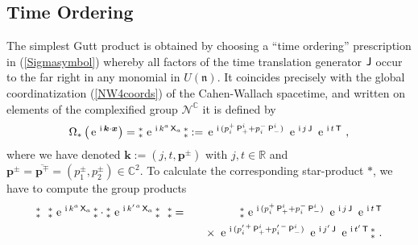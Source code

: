 \documentclass[11pt,a4paper]{article}
\newcommand{\NOa}{\mbox{$\substack{\ast\\\ast}$}}       %
\newcommand{\1}{\mathbb{1}}
\newcommand{\mbf}[1]{{\boldsymbol {#1} }}
\def\ii{{\,{\rm i}\,}}
\def\P{{\sf P}}
\def\T{{\sf T}}
\def\X{{\sf X}}
\def\J{{\sf J}}
\def\mx{{\mbf x}}
\def\mk{{\mbf k}}
\def\mbp{{\mbf p}}
\def\mfn{{\mathfrak n}}
\newcommand{\complex}{{\mathbb C}} %
\newcommand{\real}{{\mathbb R}} %
\def\e{{\,\rm e}\,}
\def\bea{\begin{eqnarray}}
\def\eea{\end{eqnarray}}
\begin{document}
\subsection{Time Ordering\label{TOP}}

The simplest Gutt product is obtained by choosing a ``time ordering''
prescription in (\ref{Sigmasymbol}) whereby all factors of the time
translation generator $\J$ occur to the far right in any monomial in
$U(\mfn)$. It coincides precisely with the global coordinatization
(\ref{NW4coords}) of the Cahen-Wallach spacetime, and written on
elements of the complexified group
$\mathcal{N}^\complex$ it is defined by
\begin{equation}
  \label{eq:time:defn}
\Omega_*\left(\e^{\ii\mk\cdot\mx}\right)=
\NOa\,\e^{\ii k^a\,\X_a}\,\NOa:=\e^{\ii(p_i^+\,\P^i_+
+p_i^-\,\P^i_-)}~\e^{\ii j\,\J}~\e^{\ii t\,\T} \ ,
\end{equation}
where we have denoted
$\mk:=(j,t,\mbp^\pm)$ with $j,t\in\real$ and
$\mbp^\pm=\overline{\mbp^\mp}=(p_1^\pm,p_2^\pm)\in\complex^2$. To
calculate the corresponding star-product $*$, we have to compute the
group products
\bea
\NOa~~\NOa\,\e^{\ii k^a\,\X_a}\,\NOa\cdot\NOa\,\e^{\ii k^{\prime\,a}\,\X_a}
\,\NOa~~\NOa&=&\NOa\,\e^{\ii(p_i^+\,\P^i_++p_i^-\,\P^i_-)}~\e^{\ii j\,\J}~
\e^{\ii t\,\T}\nonumber\\ && \quad\times~
\e^{\ii(p_i^{\prime\,+}\,\P^i_++p_i^{\prime\,-}\,\P^i_-)}~\e^{\ii j'\,\J}~
\e^{\ii t'\,\T}\,\NOa \ .
\label{TOgpprods}\eea
\end{document}
